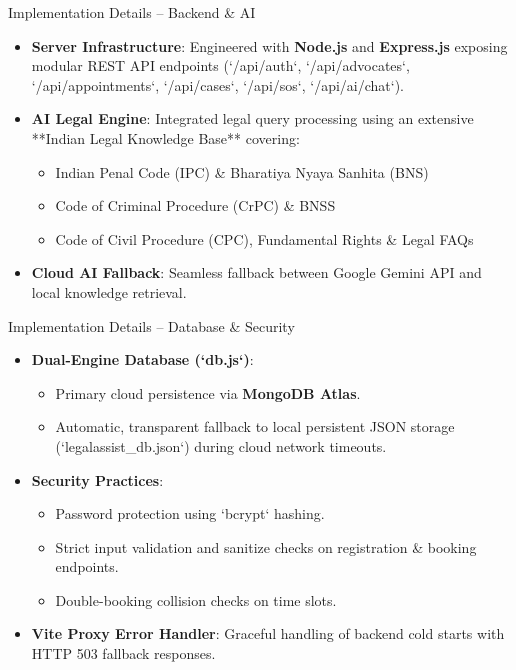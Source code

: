 \documentclass[10pt,aspectratio=169]{beamer}
\begin{document}
\begin{frame}{Implementation Details -- Backend \& AI}
  \begin{itemize}
    \setlength{\itemsep}{10pt}
    \item \textbf{Server Infrastructure}: Engineered with \textbf{Node.js} and \textbf{Express.js} exposing modular REST API endpoints (`/api/auth`, `/api/advocates`, `/api/appointments`, `/api/cases`, `/api/sos`, `/api/ai/chat`).
    \item \textbf{AI Legal Engine}: Integrated legal query processing using an extensive **Indian Legal Knowledge Base** covering:
      \begin{itemize}
        \item Indian Penal Code (IPC) \& Bharatiya Nyaya Sanhita (BNS)
        \item Code of Criminal Procedure (CrPC) \& BNSS
        \item Code of Civil Procedure (CPC), Fundamental Rights \& Legal FAQs
      \end{itemize}
    \item \textbf{Cloud AI Fallback}: Seamless fallback between Google Gemini API and local knowledge retrieval.
  \end{itemize}
\end{frame}

\begin{frame}{Implementation Details -- Database \& Security}
  \begin{itemize}
    \setlength{\itemsep}{10pt}
    \item \textbf{Dual-Engine Database (`db.js`)}:
      \begin{itemize}
        \item Primary cloud persistence via \textbf{MongoDB Atlas}.
        \item Automatic, transparent fallback to local persistent JSON storage (`legalassist_db.json`) during cloud network timeouts.
      \end{itemize}
    \item \textbf{Security Practices}:
      \begin{itemize}
        \item Password protection using `bcrypt` hashing.
        \item Strict input validation and sanitize checks on registration & booking endpoints.
        \item Double-booking collision checks on time slots.
      \end{itemize}
    \item \textbf{Vite Proxy Error Handler}: Graceful handling of backend cold starts with HTTP 503 fallback responses.
  \end{itemize}
\end{frame}
\end{document}
